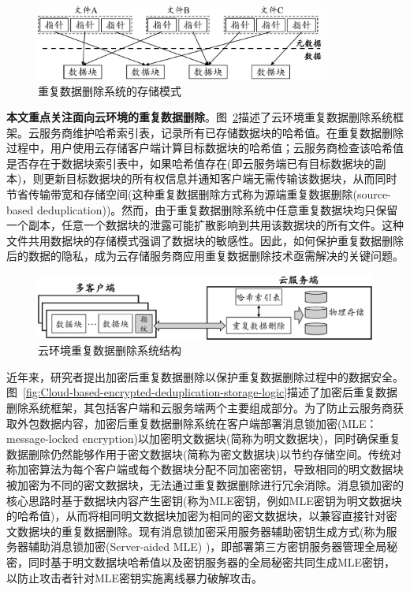 \begin{figure}[!htb]
    \small
    \centering
    \includegraphics[width=0.85\textwidth]{pic/dedupOverview.pdf}
    \caption{重复数据删除系统的存储模式} 
    \label{fig:Deduplication-storage-pattern}
\end{figure} 

\textbf{本文重点关注面向云环境的重复数据删除}。图~\ref{fig:Cloud-based-deduplication-storage-logic}描述了云环境重复数据删除系统框架。云服务商维护哈希索引表，记录所有已存储数据块的哈希值。在重复数据删除过程中，用户使用云存储客户端计算目标数据块的哈希值；云服务商检查该哈希值是否存在于数据块索引表中，如果哈希值存在(即云服务端已有目标数据块的副本)，则更新目标数据块的所有权信息并通知客户端无需传输该数据块，从而同时节省传输带宽和存储空间(这种重复数据删除方式称为源端重复数据删除(source-based deduplication))。然而，由于重复数据删除系统中任意重复数据块均只保留一个副本，任意一个数据块的泄露可能扩散影响到共用该数据块的所有文件。这种文件共用数据块的存储模式强调了数据块的敏感性。因此，如何保护重复数据删除后的数据的隐私，成为云存储服务商应用重复数据删除技术亟需解决的关键问题。

\begin{figure}[!htb]
    \small
    \centering
    \includegraphics[width=\textwidth]{pic/Cloud-deduplication.pdf}
    \caption{云环境重复数据删除系统结构} 
    \label{fig:Cloud-based-deduplication-storage-logic}
\end{figure} 

近年来，研究者提出加密后重复数据删除\cite{bellare2013MLE}以保护重复数据删除过程中的数据安全。图~\ref{fig:Cloud-based-encrypted-deduplication-storage-logic}描述了加密后重复数据删除系统框架，其包括客户端和云服务端两个主要组成部分。为了防止云服务商获取外包数据内容，加密后重复数据删除系统在客户端部署消息锁加密(MLE：message-locked encryption)\cite{bellare2013MLE}以加密明文数据块(简称为明文数据块)，同时确保重复数据删除仍然能够作用于密文数据块(简称为密文数据块)以节约存储空间。传统对称加密算法为每个客户端或每个数据块分配不同加密密钥，导致相同的明文数据块被加密为不同的密文数据块，无法通过重复数据删除进行冗余消除。消息锁加密的核心思路时基于数据块内容产生密钥(称为MLE密钥，例如MLE密钥为明文数据块的哈希值\cite{douceur2002reclaiming})，从而将相同明文数据块加密为相同的密文数据块，以兼容直接针对密文数据块的重复数据删除。现有消息锁加密采用服务器辅助密钥生成方式(称为服务器辅助消息锁加密(Server-aided MLE)
\cite{bellare2013DupLESS})，即部署第三方密钥服务器管理全局秘密，同时基于明文数据块哈希值以及密钥服务器的全局秘密共同生成MLE密钥，以防止攻击者针对MLE密钥实施离线暴力破解攻击。

